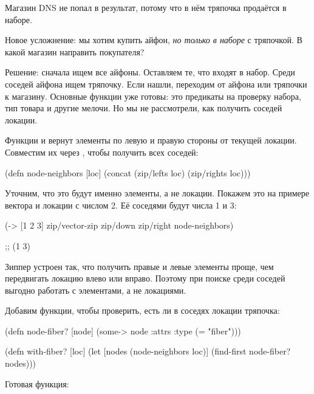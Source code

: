 Магазин DNS не попал в результат, потому что в нём тряпочка продаётся в наборе.

Новое усложнение: мы хотим купить айфон, \emph{но только в наборе} с тряпочкой. В
какой магазин направить покупателя?

Решение: сначала ищем все айфоны. Оставляем те, что входят в набор. Среди
соседей айфона ищем тряпочку. Если нашли, переходим от айфона или тряпочки к
магазину. Основные функции уже готовы: это предикаты на проверку набора, тип
товара и другие мелочи. Но мы не рассмотрели, как получить соседей локации.

Функции  и  вернут элементы по левую и правую
стороны от текущей локации. Совместим их через , чтобы получить
всех соседей:

\begin{english}
  \begin{clojure}
(defn node-neighbors [loc]
  (concat (zip/lefts loc)
          (zip/rights loc)))
  \end{clojure}
\end{english}

Уточним, что это будут именно элементы, а не локации. Покажем это на примере
вектора и локации с числом 2. Её соседями будут числа 1 и 3:

\begin{english}
  \begin{clojure}
(-> [1 2 3]
    zip/vector-zip
    zip/down
    zip/right
    node-neighbors)

;; (1 3)
  \end{clojure}
\end{english}

Зиппер устроен так, что получить правые и левые элементы проще, чем передвигать
локацию влево или вправо. Поэтому при поиске среди соседей выгодно работать с
элементами, а не локациями.

Добавим функции, чтобы проверить, есть ли в соседях локации тряпочка:

\begin{english}
  \begin{clojure}
(defn node-fiber?
  [node]
  (some-> node :attrs :type (= "fiber")))

(defn with-fiber?
  [loc]
  (let [nodes (node-neighbors loc)]
    (find-first node-fiber? nodes)))
  \end{clojure}
\end{english}

Готовая функция:

